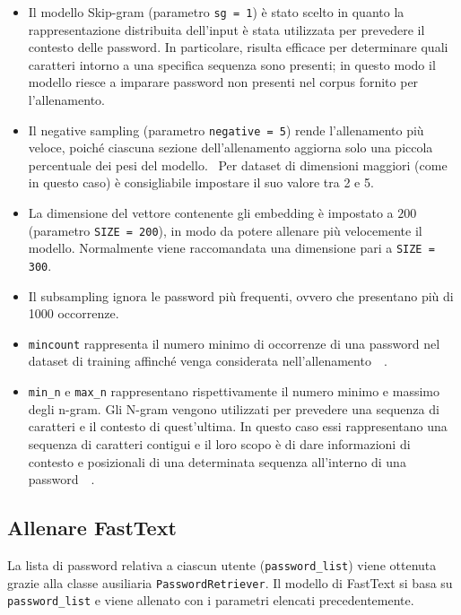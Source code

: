 \begin{itemize}
    \item Il modello Skip-gram (parametro \texttt{sg = 1}) è stato scelto in quanto la rappresentazione distribuita dell'input è stata utilizzata per prevedere il contesto delle password. In particolare, risulta efficace per determinare quali caratteri intorno a una specifica sequenza sono presenti; in questo modo il modello riesce a imparare password non presenti nel corpus fornito per l'allenamento.~\cite{fasttext}
    \item Il negative sampling (parametro \texttt{negative = 5}) rende l'allenamento più veloce, poiché ciascuna sezione dell'allenamento aggiorna solo una piccola percentuale dei pesi del modello.~\cite{negative} Per dataset di dimensioni maggiori (come in questo caso) è consigliabile impostare il suo valore tra 2 e 5.~\cite{gensim}
    \item La dimensione del vettore contenente gli embedding è impostato a $200$ (parametro \texttt{SIZE = 200}), in modo da potere allenare più velocemente il modello. Normalmente viene raccomandata una dimensione pari a \texttt{SIZE = 300}.~\cite{gensim}
    \item Il subsampling ignora le password più frequenti, ovvero che presentano più di 1000 occorrenze.
    \item \texttt{mincount} rappresenta il numero minimo di occorrenze di una password nel dataset di training affinché venga considerata nell'allenamento~\cite{biijeta}~\cite{gensim}.
    \item \texttt{min\_n} e \texttt{max\_n} rappresentano rispettivamente il numero minimo e massimo degli n-gram. Gli N-gram vengono utilizzati per prevedere una sequenza di caratteri e il contesto di quest'ultima. In questo caso essi rappresentano una sequenza di caratteri contigui e il loro scopo è di dare informazioni di contesto e posizionali di una determinata sequenza all'interno di una password~\cite{biijeta}~\cite{gensim}.
\end{itemize}

\subsection{Allenare FastText}
\label{sec:allenare fasttext}
La lista di password relativa a ciascun utente (\texttt{password\_list}) viene ottenuta grazie alla classe ausiliaria \texttt{PasswordRetriever}. Il modello di FastText si basa su \texttt{password\_list} e viene allenato con i parametri elencati precedentemente.

